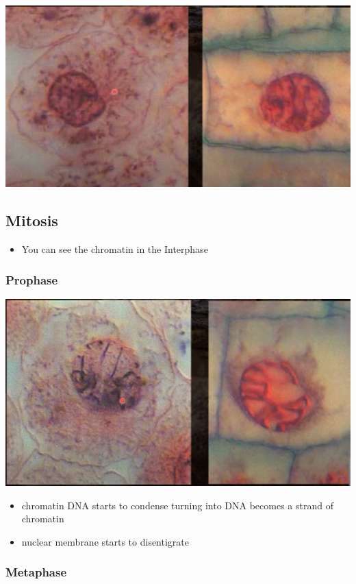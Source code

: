 \documentclass{article}
\begin{document}
\includegraphics*[scale=0.5]{interphase.png}

\subsection*{Mitosis}
\begin{itemize}
    \item You can see the chromatin in the Interphase
\end{itemize}
\subsubsection*{Prophase}

\includegraphics*[scale=0.5]{prophase.png}


\begin{itemize}
    \item chromatin DNA starts to condense turning into DNA becomes a strand of chromatin
    \item nuclear membrane starts to disentigrate
\end{itemize}
\subsubsection*{Metaphase}
\end{document}
